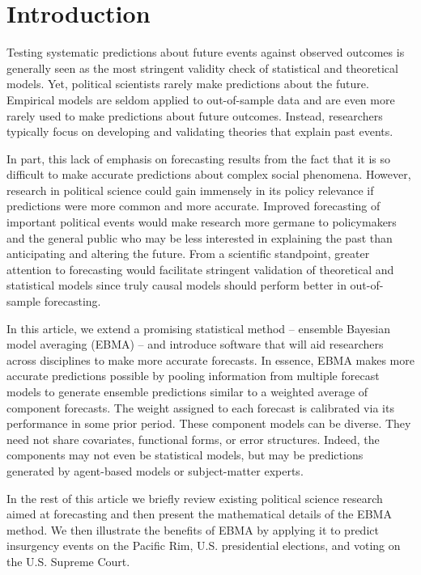 
\section{Introduction}
Testing systematic predictions about future events against observed
outcomes is generally seen as the most stringent validity check of
statistical and theoretical models.  Yet, political scientists rarely
make predictions about the future.  Empirical models are seldom
applied to out-of-sample data and are even more rarely used to make
predictions about future outcomes. Instead, researchers typically
focus on developing and validating theories that explain past events.

In part, this lack of emphasis on forecasting results from the fact
that it is so difficult to make accurate predictions about complex
social phenomena. However, research in political science could gain
immensely in its policy relevance if predictions were more common and
more accurate.  Improved forecasting of important political events
would make research more germane to policymakers and the general
public who may be less interested in explaining the past than
anticipating and altering the future.  From a scientific standpoint,
greater attention to forecasting would facilitate stringent validation
of theoretical and statistical models since truly causal models should
perform better in out-of-sample forecasting.

In this article, we extend a promising statistical method -- ensemble
Bayesian model averaging (EBMA) -- and introduce software that will
aid researchers across disciplines to make more accurate forecasts.
In essence, EBMA makes more accurate predictions possible by pooling
information from multiple forecast models to generate ensemble
predictions similar to a weighted average of component forecasts. The
weight assigned to each forecast is calibrated via its performance in
some prior period.  These component models can be diverse.  They need
not share covariates, functional forms, or error structures. Indeed,
the components may not even be statistical models, but may be
predictions generated by agent-based models or subject-matter experts.

In the rest of this article we briefly review
existing political science research aimed at forecasting and then
present the mathematical details of the EBMA method. We then
illustrate the benefits of EBMA by applying it to predict insurgency
events on the Pacific Rim, U.S. presidential elections, and voting on
the U.S. Supreme Court.

